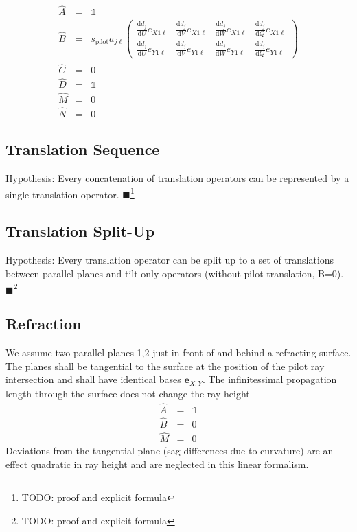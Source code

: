 \documentclass[12pt,a4paper,twoside,openright,BCOR10mm,headsepline,titlepage,abstracton,chapterprefix,final]{scrreprt}
\newcommand\Vector[1]{{\mathbf{#1}}}
\newcommand\unittensor{\mathds{1}}
\newcommand{\remark}[1]{{\color{red}$\blacksquare$}\footnote{{\color{red}#1}}}
\newcommand\totald{\textrm{d}}
\newcommand\pilot{\textrm{pilot}}
\begin{document}
\begin{subequations} \label{eq:xyuv_parallel_translation_matrices}
\begin{eqnarray}
 \hat{A} &=& \unittensor \\
 \hat{B} &=& s_{\pilot} a_{j\ell}
 \begin{pmatrix}
 \frac{\totald d_j}{\totald U} e_{X1\ell} & \frac{\totald d_j}{\totald V} e_{X1\ell} & \frac{\totald d_j}{\totald W} e_{X1\ell} & \frac{\totald d_j}{\totald Q} e_{X1\ell} \\
 \frac{\totald d_j}{\totald U} e_{Y1\ell} & \frac{\totald d_j}{\totald V} e_{Y1\ell} & \frac{\totald d_j}{\totald W} e_{Y1\ell} & \frac{\totald d_j}{\totald Q} e_{Y1\ell}
 \end{pmatrix}
\\
\hat{C} &=& 0 \\
\hat{D} &=& \unittensor \\
\hat{M} &=& 0 \\
\hat{N} &=& 0
\end{eqnarray}
\end{subequations}


\subsection{Translation Sequence}
Hypothesis:
Every concatenation of translation operators can be represented by a single translation operator.
\remark{TODO: proof and explicit formula}


\subsection{Translation Split-Up}
Hypothesis:
Every translation operator can be split up to a set of translations between parallel planes and tilt-only operators (without pilot translation, B=0).
\remark{TODO: proof and explicit formula}


\subsection{Refraction}
We assume two parallel planes 1,2 just in front of and behind a refracting surface.
The planes shall be tangential to the surface at the position of the pilot ray intersection
and shall have identical bases $\Vector{e}_{X,Y}$.
The infinitessimal propagation length through the surface does not change the ray height
\begin{eqnarray}
 \hat{A} &=& \unittensor \\
 \hat{B} &=& 0 \\
 \hat{M} &=& 0
\end{eqnarray}
Deviations from the tangential plane (sag differences due to curvature) 
are an effect quadratic in ray height and are neglected in this linear formalism.
\end{document}
